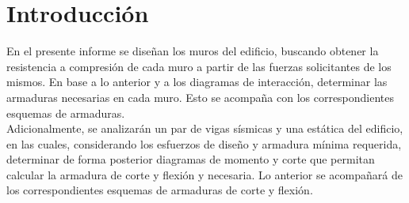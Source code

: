 \section{Introducción}
En el presente informe se diseñan los muros del edificio, buscando obtener la resistencia a compresión de cada muro a partir de las fuerzas solicitantes de los mismos. En base a lo anterior y a los diagramas de interacción, determinar las armaduras necesarias en cada muro. Esto se acompaña con los correspondientes esquemas de armaduras.\\

Adicionalmente, se analizarán un par de vigas sísmicas y una estática del edificio, en las cuales, considerando los esfuerzos de diseño y armadura mínima requerida, determinar de forma posterior diagramas de momento y corte que permitan calcular la armadura de corte y flexión y necesaria. Lo anterior se acompañará de los correspondientes esquemas de armaduras de corte y flexión. 